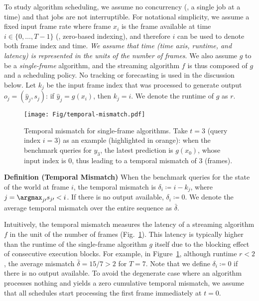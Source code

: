To study algorithm scheduling, we assume no concurrency (\ie, a single job at a time) and that jobs are not interruptible. For notational simplicity, we assume a fixed input frame rate where frame $x_i$ is the frame available at time $i \in  \{0, \ldots, T-1\}$ (\ie, zero-based indexing), and therefore $i$ can be used to denote both frame index and time. {\em We assume that time (time axis, runtime, and latency) is represented in the units of the number of frames}. We also assume $g$ to be a {\em single-frame} algorithm, and the streaming algorithm $f$ is thus composed of $g$ and a scheduling policy. No tracking or forecasting is used in the discussion below.
Let $k_j$ be the input frame index that was processed to generate output $o_j = (\hat{y}_j, s_j)$: if $\hat{y}_j = g(x_i)$, then $k_j = i$. We denote the runtime of $g$ as $r$. 

\begin{figure}[!b]
\centering
\texttt{[image: Fig/temporal-mismatch.pdf]}

\caption{Temporal mismatch for single-frame algorithms. Take $t=3$ 
(query index $i = 3$)
as an example (highlighted in orange): when the benchmark queries for $y_3$, the latest prediction is $g(x_0)$, whose input index is 0, thus leading to a temporal mismatch of 3 (frames).}
\label{fig:temporalmismatch}
\end{figure}

{\noindent \bf Definition (Temporal Mismatch)} When the benchmark queries for the state of the world at frame $i$, the temporal mismatch is $\delta_i \coloneqq i - k_j$, where $j = \argmax_{j\prime} s_{j\prime} < i$.
If there is no output available, $\delta_i \coloneqq 0$. We denote the average temporal mismatch over the entire sequence as $\bar{\delta}$.

Intuitively, the temporal mismatch measures the latency of a streaming algorithm $f$ in the unit of the number of frames (Fig.~\ref{fig:temporalmismatch}). This latency is typically higher than the runtime of the single-frame algorithm $g$ itself due to the blocking effect of consecutive execution blocks. For example, in Figure~\ref{fig:temporalmismatch}, although runtime $r < 2$, the average mismatch $\bar{\delta} = 15/7 > 2$ for $T = 7$. Note that we define $\delta_i \coloneqq 0$ if there is no output available. To avoid the degenerate case where an algorithm processes nothing and yields a zero cumulative temporal mismatch, we assume that all schedules start processing the first frame immediately at $t = 0$.

